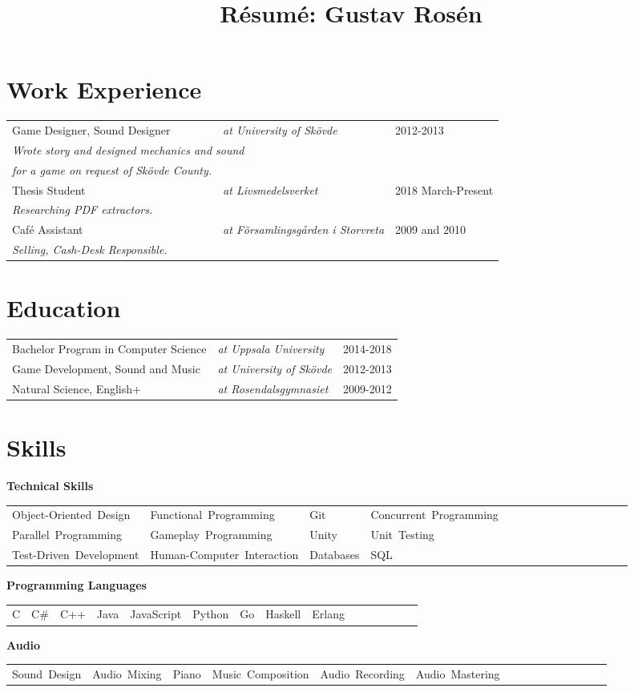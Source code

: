 \documentclass{article}
\title{Résumé: Gustav Rosén}
\author{}
\date{}
\newcommand{\we}[4]{#1 \hspace{1em}& \textit{at #2} & #3 \\ \multicolumn{3}{l}{\indent \textit{#4}}\\ }
\newcommand{\skill}[1]{\mbox{#1\hspace{1.2ex}}}
\newcommand{\cat}[1]{\vspace{2ex}

\noindent \textbf{#1} 

\begin{tabular}{lllllllllllllll}}
\newcommand{\catend}{\end{tabular}}
\newcommand{\program}[4]{#1 & \textit{at #2} & #3-#4 \\}
\renewcommand{\footnote}[1]{}
\begin{document}
\maketitle
\thispagestyle{empty}



\section{Work Experience}
\begin{tabular}{lll}
\we{Game Designer, Sound Designer}{University of Skövde}{2012-2013}{Wrote story and designed mechanics and sound}
\indent \textit{for a game on request of Skövde County.} \\
\we{Thesis Student}{Livsmedelsverket}{2018 March-Present}{Researching PDF extractors.}
\we{Café Assistant}{Församlingsgården i Storvreta}{2009 and 2010}{Selling, Cash-Desk Responsible.}
\end{tabular}

\section{Education}
\begin{tabular}{lll}
\program{Bachelor Program in Computer Science}{Uppsala University}{2014}{2018\footnote{Currently ongoing.}}
\program{Game Development, Sound and Music}{University of Skövde}{2012}{2013}
\program{Natural Science, English+}{Rosendalsgymnasiet}{2009}{2012}
\end{tabular}

\section{Skills}

\cat{Technical Skills}%
\skill{Object-Oriented Design}&
\skill{Functional Programming}&
\skill{Git}&
\skill{Concurrent Programming}\\
\skill{Parallel Programming}&
\skill{Gameplay Programming}&
\skill{Unity}&
\skill{Unit Testing}\\
\skill{Test-Driven Development}&
\skill{Human-Computer Interaction}&
\skill{Databases}&
\skill{SQL}\\
\catend

\cat{Programming Languages}%
\skill{C}&
\skill{C\#}&
\skill{C++}&
\skill{Java}&
\skill{JavaScript}&
\skill{Python}&
\skill{Go}&
\skill{Haskell}&
\skill{Erlang}\\
\catend

\cat{Audio}%
\skill{Sound Design}&
\skill{Audio Mixing}&
\skill{Piano}&
\skill{Music Composition}&
\skill{Audio Recording}&
\skill{Audio Mastering}\\
\catend
\end{document}
